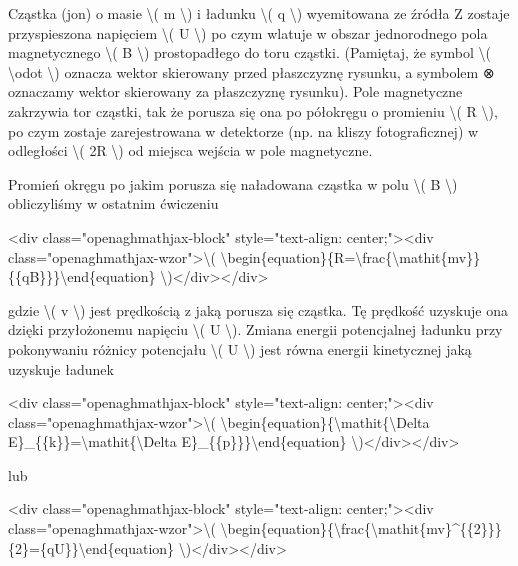 Cząstka (jon) o masie \textbackslash{}( m \textbackslash{}) i ładunku
\textbackslash{}( q \textbackslash{}) wyemitowana ze źródła Z zostaje
przyspieszona napięciem \textbackslash{}( U \textbackslash{}) po czym
wlatuje w obszar jednorodnego pola magnetycznego \textbackslash{}( B
\textbackslash{}) prostopadłego do toru cząstki. (Pamiętaj, że symbol
\textbackslash{}( \textbackslash{}odot \textbackslash{}) oznacza wektor
skierowany przed płaszczyznę rysunku, a symbolem ⊗ oznaczamy wektor
skierowany za płaszczyznę rysunku). Pole magnetyczne zakrzywia tor
cząstki, tak że porusza się ona po półokręgu o promieniu
\textbackslash{}( R \textbackslash{}), po czym zostaje zarejestrowana w
detektorze (np. na kliszy fotograficznej) w odległości \textbackslash{}(
2R \textbackslash{}) od miejsca wejścia w pole magnetyczne.

Promień okręgu po jakim porusza się naładowana cząstka w polu
\textbackslash{}( B \textbackslash{}) obliczyliśmy w ostatnim ćwiczeniu

\textless{}div class="openaghmathjax-block" style="text-align:
center;"\textgreater{}\textless{}div
class="openaghmathjax-wzor"\textgreater{}\textbackslash{}(
\textbackslash{}begin\{equation\}\{R=\textbackslash{}frac\{\textbackslash{}mathit\{mv\}\}\{\{qB\}\}\}\textbackslash{}end\{equation\}
\textbackslash{})\textless{}/div\textgreater{}\textless{}/div\textgreater{}

gdzie \textbackslash{}( v \textbackslash{}) jest prędkością z jaką
porusza się cząstka. Tę prędkość uzyskuje ona dzięki przyłożonemu
napięciu \textbackslash{}( U \textbackslash{}). Zmiana energii
potencjalnej ładunku przy pokonywaniu różnicy potencjału
\textbackslash{}( U \textbackslash{}) jest równa energii kinetycznej
jaką uzyskuje ładunek

\textless{}div class="openaghmathjax-block" style="text-align:
center;"\textgreater{}\textless{}div
class="openaghmathjax-wzor"\textgreater{}\textbackslash{}(
\textbackslash{}begin\{equation\}\{\textbackslash{}mathit\{\textbackslash{}Delta
E\}\_\{\{k\}\}=\textbackslash{}mathit\{\textbackslash{}Delta
E\}\_\{\{p\}\}\}\textbackslash{}end\{equation\}
\textbackslash{})\textless{}/div\textgreater{}\textless{}/div\textgreater{}

lub

\textless{}div class="openaghmathjax-block" style="text-align:
center;"\textgreater{}\textless{}div
class="openaghmathjax-wzor"\textgreater{}\textbackslash{}(
\textbackslash{}begin\{equation\}\{\textbackslash{}frac\{\textbackslash{}mathit\{mv\}\^{}\{\{2\}\}\}\{2\}=\{qU\}\}\textbackslash{}end\{equation\}
\textbackslash{})\textless{}/div\textgreater{}\textless{}/div\textgreater{}

